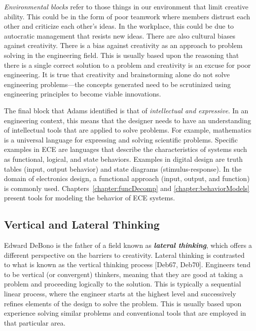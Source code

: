 \emph{Environmental blocks} refer to those things in our environment
that limit creative ability. This could be in the form of poor teamwork
where members distrust each other and criticize each other's ideas. In
the workplace, this could be due to autocratic management that resists
new ideas. There are also cultural biases against creativity. There is a
bias against creativity as an approach to problem solving in the
engineering field. This is usually based upon the reasoning that there
is a single correct solution to a problem and creativity is an excuse
for poor engineering. It is true that creativity and brainstorming alone
do not solve engineering problems---the concepts generated need to be
scrutinized using engineering principles to become viable innovations.

The final block that Adams identified is that of \emph{intellectual and
expressive}. In an engi­neering context, this means that the designer
needs to have an understanding of intellectual tools that are applied to
solve problems. For example, mathematics is a universal language for
expressing and solving scientific problems. Specific examples in ECE are
languages that de­scribe the characteristics of systems such as
functional, logical, and state behaviors. Examples in digital design are
truth tables (input, output behavior) and state diagrams
(stimulus-response). In the domain of electronics design, a functional
approach (input, output, and function) is commonly used. 
Chapters~\ref{chapter:funcDecomp} and \ref{chapter:behaviorModels} 
present tools for modeling the behavior of ECE systems.

\subsection{Vertical and Lateral Thinking}
\label{subsection:vertical-and-lateral-thinking}

Edward DeBono is the father of a field known as \emph{\textbf{lateral
thinking}}, which offers a different per­spective on the barriers to
creativity. Lateral thinking is contrasted to what is known as the
vertical thinking process {[}Deb67, Deb70{]}. Engineers tend to be
vertical (or convergent) think­ers, meaning that they are good at taking
a problem and proceeding logically to the solution. This is typically a
sequential linear process, where the engineer starts at the highest
level and successively refines elements of the design to solve the
problem. This is usually based upon experience solving similar problems
and conventional tools that are employed in that par­ticular area.

